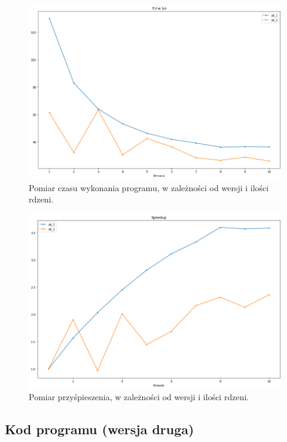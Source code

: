 \documentclass{article}
\begin{document}
        \begin{figure}[h!]
            \centering
            \includegraphics[width=17cm]{report2/images/Compare/time.png}
            \caption{Pomiar czasu wykonania programu, w zależności od wersji i ilości rdzeni. }
        \end{figure}
    
    \newpage    
        \begin{figure}[h!]
            \centering
            \includegraphics[width=17cm]{report2/images/Compare/speedup.png}
            \caption{Pomiar przyśpieszenia, w zależności od wersji i ilości rdzeni.}
        \end{figure}
        
    \FloatBarrier
    \newpage
    \subsection{Kod programu (wersja druga)}
        
\end{document}
